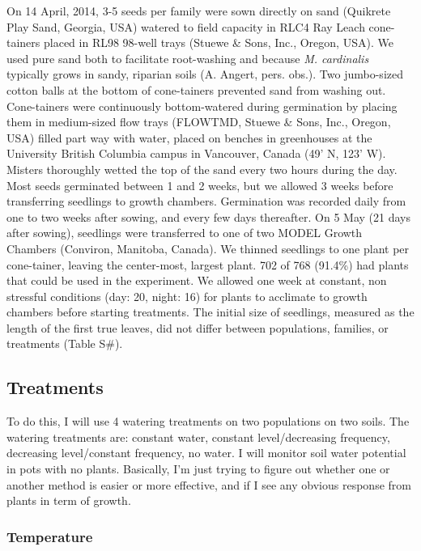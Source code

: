 \documentclass[11pt, oneside]{article}
\begin{document}
On 14 April, 2014, 3-5 seeds per family were sown directly on sand (Quikrete Play Sand, Georgia, USA) watered to field capacity in RLC4 Ray Leach cone-tainers placed in RL98 98-well trays (Stuewe \& Sons, Inc., Oregon, USA). We used pure sand both to facilitate root-washing and because \textit{M. cardinalis} typically grows in sandy, riparian soils (A. Angert, pers. obs.). Two jumbo-sized cotton balls at the bottom of cone-tainers prevented sand from washing out. Cone-tainers were continuously bottom-watered during germination by placing them in medium-sized flow trays (FLOWTMD, Stuewe \& Sons, Inc., Oregon, USA) filled part way with water, placed on benches in greenhouses at the University British Columbia campus in Vancouver, Canada (49' N, 123' W). Misters thoroughly wetted the top of the sand every two hours during the day. Most seeds germinated between 1 and 2 weeks, but we allowed 3 weeks before transferring seedlings to growth chambers. Germination was recorded daily from one to two weeks after sowing, and every few days thereafter. On 5 May (21 days after sowing), seedlings were transferred to one of two MODEL Growth Chambers (Conviron, Manitoba, Canada). We thinned seedlings to one plant per cone-tainer, leaving the center-most, largest plant. 702 of 768 (91.4\%) had plants that could be used in the experiment. We allowed one week at constant, non stressful conditions (day: 20\celsius, night: 16\celsius) for plants to acclimate to growth chambers before starting treatments. The initial size of seedlings, measured as the length of the first true leaves, did not differ between populations, families, or treatments (Table S\#).

\subsection*{Treatments}

To do this, I will use 4 watering treatments on two populations on two soils. The watering treatments are: constant water, constant level/decreasing frequency, decreasing level/constant frequency, no water. I will monitor soil water potential in pots with no plants. Basically, I'm just trying to figure out whether one or another method is easier or more effective, and if I see any obvious response from plants in term of growth.

\subsubsection*{Temperature}
\end{document}
